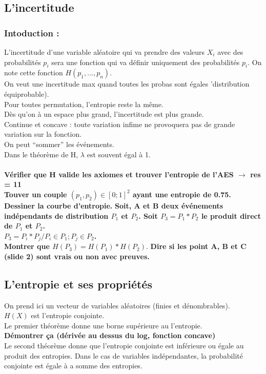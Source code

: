 \subsection{L'incertitude}
\subsubsection{Intoduction : }
L'incertitude d'une variable aléatoire qui va prendre des valeurs $X_i$ avec des probabilités $p_i$ sera une fonction qui va définir uniquement des probabilités $p_i$. On note cette fonction $H(p_1, ..., p_n)$.\\
On veut une incertitude max quand toutes les probas sont égales 'distribution équiprobable).\\
Pour toutes permutation, l'entropie reste la même.\\
Dès qu'on à un espace plus grand, l'incertitude est plus grande.\\
Continue et concave : toute variation infime ne provoquera pas de grande variation sur la fonction.\\
On peut \enquote{sommer} les événements.\\
Dans le théorème de H, $\lambda$ est souvent égal à 1.\\~\\
\textbf{Vérifier que H valide les axiomes et trouver l'entropie de l'AES $\rightarrow$ res = 11}\\
\textbf{Touver un couple $(p_1, p_2) \in [0;1]^2$ ayant une entropie de 0.75. Dessiner la courbe d'entropie.}
\textbf{Soit, A et B deux événements indépendants de distribution $P_1$ et $P_2$. Soit $P_3 = P_1 * P_2$ le produit direct de $P_1$ et $P_2$.\\$P_3 = {P_i * P_j / P_i \in P_1 ; P_j \in P_2}$.\\Montrer que $H(P_3)=H(P_1)*H(P_2)$}.
\textbf{Dire si les point A, B et C (slide 2) sont vrais ou non avec preuves.}

\subsection{L'entropie et ses propriétés}

On prend ici un vecteur de variables aléatoires (finies et dénombrables).\\
$H(X)$ est l'entropie conjointe.\\
Le premier théorème donne une borne supérieure au l'entropie.\\
\textbf{Démontrer ça (dérivée au dessus du log, fonction concave)}\\
Le second théorème donne que l'entropie conjointe est inférieure ou égale au produit des entropies. Dans le cas de variables indépendantes, la probabilité conjointe est égale à a somme des entropies.

